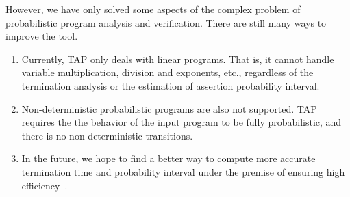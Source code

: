 \documentclass[sigconf,review, anonymous]{acmart}
\begin{document}
However, we have only solved some aspects of the complex problem of probabilistic program analysis and verification. There are still many ways to improve the tool.
\begin{enumerate}
	\item Currently, TAP only deals with linear programs. That is, it cannot handle variable multiplication, division and exponents, etc., regardless of the termination analysis or the estimation of assertion probability interval.
	\item Non-deterministic probabilistic programs  are also not supported. TAP requires the the behavior of the input program to be fully probabilistic, and there is no non-deterministic transitions. 
	\item In the future, we hope to find a better way to compute more accurate termination time and probability interval under the premise of ensuring high efficiency~\cite{Hermanns2013Probabilistic}. 
\end{enumerate}




\end{document}
